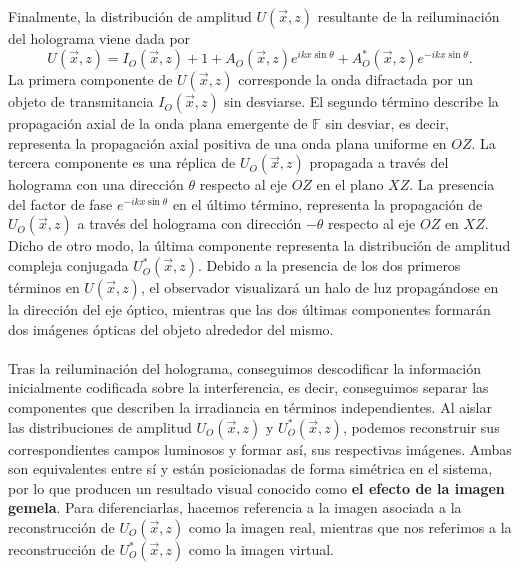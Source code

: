 \documentclass[12pt]{article}
\begin{document}
 Finalmente,  la distribución de amplitud  $U(\Vec{x}, z)$ resultante de la reiluminación del holograma  viene dada por
 \begin{equation}
    U(\Vec{x}, z) = I_O (\Vec{x}, z) +  1 +  A_O (\Vec{x}, z) e^{i k x \sin{\theta}} +  A_O^{*} (\Vec{x}, z)  e^{- i k x \sin{\theta}}.
    \label{Ec.10}
\end{equation}
La primera componente de $U (\Vec{x}, z)$ corresponde la onda difractada por un objeto de transmitancia $I_O (\vec{x},z)$ sin desviarse. El segundo término describe  la propagación axial  de la onda plana emergente de $\mathbb{F}$ sin desviar, es decir, representa la propagación axial positiva de una onda plana uniforme en $OZ$.  La tercera componente es una réplica de  $U_O (\Vec{x}, z)$ propagada a través del holograma con una dirección  $\theta$ respecto al eje $OZ$ en el plano  $XZ$. La presencia del factor de fase $e^{- i k x \sin{\theta}}$ en el último término, representa la propagación de $U_O (\Vec{x}, z)$  a través del holograma con  dirección $ - \theta$ respecto al eje $OZ$ en $XZ$. Dicho de otro modo, la última componente representa la distribución de amplitud compleja conjugada $U_O^{*} (\Vec{x}, z)$. Debido a la presencia de los dos primeros términos en $U(\Vec{x}, z)$, el observador visualizará  un halo de luz  propagándose en la dirección del eje óptico, mientras que las dos últimas componentes  formarán   dos imágenes ópticas del objeto  alrededor del mismo. \\ \\
Tras la reiluminación del holograma, conseguimos descodificar la información inicialmente codificada sobre la interferencia, es decir, conseguimos separar las componentes que describen la irradiancia en términos independientes. Al aislar las distribuciones de amplitud $U_O (\Vec{x}, z)$  y  $U_O ^{*}(\Vec{x}, z)$,  podemos reconstruir sus correspondientes campos luminosos y formar así, sus respectivas imágenes. Ambas son equivalentes entre sí y están posicionadas de forma simétrica en el sistema, por lo que producen un  resultado visual conocido como \textbf{el efecto de la imagen gemela}. Para diferenciarlas, hacemos referencia a la imagen asociada a la reconstrucción de  $U_O (\Vec{x}, z)$ como la imagen real, mientras que nos referimos a la reconstrucción de $U_O ^{*}(\Vec{x}, z)$ como la imagen virtual.  \\ \\
\end{document}
